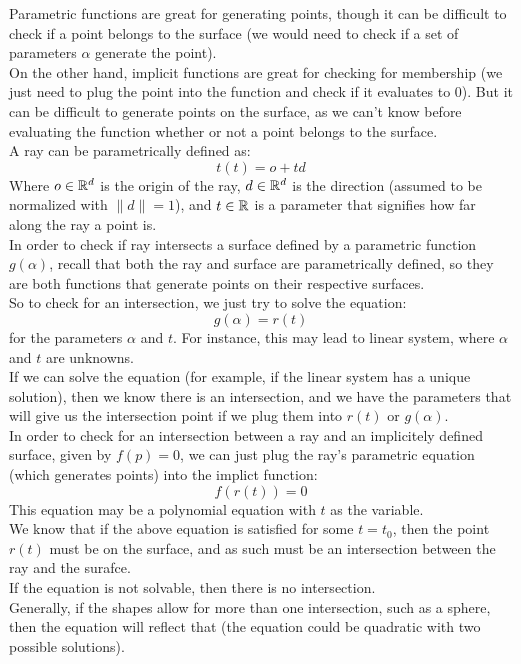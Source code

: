 \documentclass[12pt]{article}
\begin{document}
Parametric functions are great for generating
points, though it can be difficult to check 
if a point belongs to the surface 
(we would need to check if a set of
parameters $\alpha$ generate the point). \\

On the other hand, implicit functions are great
for checking for membership (we just need to
plug the point into the function and check
if it evaluates to $0$). But it can be difficult
to generate points on the surface, as we
can't know before evaluating the function
whether or not a point belongs to the surface. \\

A ray can be parametrically defined as:
\[ t(t) = o + td \]
Where $o \in \mathbb{R}^d$ is the origin of the ray,
$d \in \mathbb{R}^d$ is the direction (assumed to be
normalized with $\|d\| = 1$), and $t \in \mathbb{R}$
is a parameter that signifies how far along
the ray a point is. \\

In order to check if ray intersects a
surface defined by a parametric function
$g(\alpha)$, recall that both the ray and
surface are parametrically defined, so
they are both functions that generate points
on their respective surfaces. \\
So to check for an intersection, we just try to
solve the equation:
\[ g(\alpha) = r(t) \]
for the parameters $\alpha$ and $t$.
For instance, this may lead to linear system,
where $\alpha$ and $t$ are unknowns. \\
If we can solve the equation (for example,
if the linear system has a unique solution),
then we know there is an intersection, and
we have the parameters that will give us the
intersection point if we plug them into
$r(t)$ or $g(\alpha)$. \\

In order to check for an intersection between
a ray and an implicitely defined surface,
given by $f(p) = 0$,
we can just plug the ray's parametric equation
(which generates points) into the implict function:
\[ f(r(t)) = 0 \]
This equation may be a polynomial equation with $t$
as the variable. \\
We know that if the above equation is satisfied
for some $t = t_0$, then the point $r(t)$
must be on the surface, and as such must be
an intersection between the ray and the surafce. \\
If the equation is not solvable, then there
is no intersection. \\
Generally, if the shapes allow for more than one
intersection, such as a sphere, then the equation
will reflect that (the equation could be
quadratic with two possible solutions). \\
\end{document}
